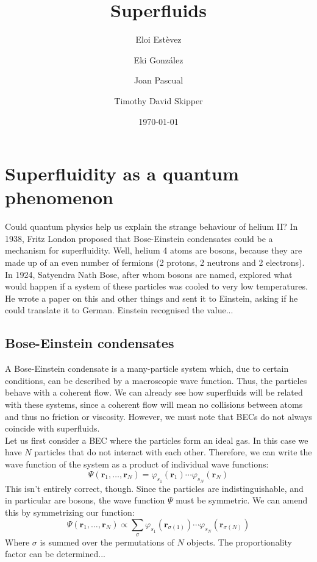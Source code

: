 \documentclass{article}
\title{Superfluids}
\author{Eloi Estèvez \and Eki González \and Joan Pascual \and Timothy David Skipper}
\date{\today}
\begin{document}
\maketitle
\begin{abstract}
\end{abstract}

\section{Superfluidity as a quantum phenomenon}

Could quantum physics help us explain the strange behaviour of helium II?  In 1938, Fritz London proposed that Bose-Einstein condensates could be a mechanism for superfluidity.  Well, helium 4 atoms are bosons, because they are made up of an even number of fermions (2 protons, 2 neutrons and 2 electrons).  In 1924, Satyendra Nath Bose, after whom bosons are named, explored what would happen if a system of these particles was cooled to very low temperatures.  He wrote a paper on this and other things and sent it to Einstein, asking if he could translate it to German.  Einstein recognised the value...

\subsection{Bose-Einstein condensates}


A Bose-Einstein condensate is a many-particle system which, due to certain
conditions, can be described by a macroscopic wave function.  Thus, the particles
behave with a coherent flow.  We can already see how superfluids will be related
with these systems, since a coherent flow will mean no collisions between atoms
and thus no friction or viscosity.  However, we must note that BECs do not always
coincide with superfluids.
\\

Let us first consider a BEC where the particles form an ideal gas.  In this case we have $N$ particles that do not interact with each other.  Therefore, we can write the wave function of the system as a product of
individual wave functions:
\[\Psi(\mathbf{r}_1, \dots, \mathbf{r}_N) =
    \varphi_{s_1}(\mathbf{r}_1)\dotsb\varphi_{s_N}(\mathbf{r}_N)\]
This isn't entirely correct, though.  Since the particles are indistinguishable, and in particular are bosons, the wave function $\Psi$ must be symmetric.  We can amend this by symmetrizing our function:
\[\Psi(\mathbf{r}_1, \dots, \mathbf{r}_N) \propto \sum_{\sigma}
        \varphi_{s_1}(\mathbf{r}_{\sigma(1)})\dotsb
        \varphi_{s_N}(\mathbf{r}_{\sigma(N)})\]
Where $\sigma$ is summed over the permutations of $N$ objects.  The proportionality factor can be determined...
\\
\end{document}
